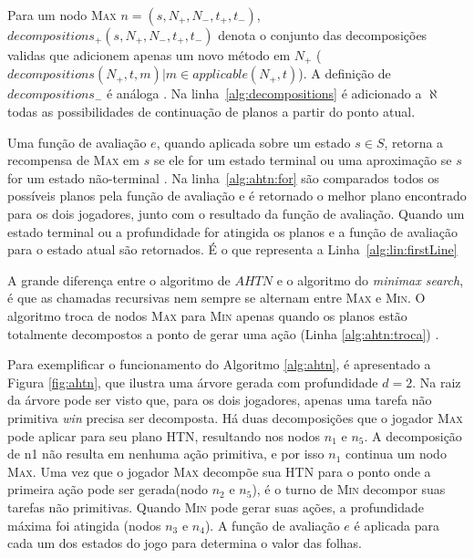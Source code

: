 Para um nodo \textsc{Max} $n = (s, N_{+}, N_{-}, t_{+}, t_{-})$, $decompositions_{+}(s, N_{+}, N_{-}, t_{+}, t_{-})$ denota o conjunto das decomposições validas que adicionem apenas um novo método em $N_{+}$ (${decompositions(N_{+}, t, m) | m \in applicable(N_{+}, t)}$).
A definição de $decompositions_{-}$ é análoga \cite{ontanon2015adversarial}.
Na linha~\ref{alg:decompositions} é adicionado a $\aleph$ todas as possibilidades de continuação de planos a partir do ponto atual.

Uma função de avaliação $e$, quando aplicada sobre um estado $s \in S$, retorna a recompensa de \textsc{Max} em $s$ se ele for um estado terminal ou uma aproximação se $s$ for um estado não-terminal \cite{ontanon2015adversarial}. 
Na linha~\ref{alg:ahtn:for} são comparados todos os possíveis planos pela função de avaliação e é retornado o melhor plano encontrado para os dois jogadores, junto com o resultado da função de avaliação. 
Quando um estado terminal ou a profundidade for atingida os planos e a função de avaliação para o estado atual são retornados. É o que representa a Linha~\ref{alg:lin:firstLine}

A grande diferença entre o algoritmo de $AHTN$ e o algoritmo do \textit{minimax search}, é que as chamadas recursivas nem sempre se alternam entre \textsc{Max} e \textsc{Min}. 
O algoritmo troca de nodos \textsc{Max} para \textsc{Min} apenas quando os planos estão totalmente decompostos a ponto de gerar uma ação (Linha \ref{alg:ahtn:troca}) \cite{ontanon2015adversarial}.

Para exemplificar o funcionamento do Algoritmo \ref{alg:ahtn}, é apresentado a Figura \ref{fig:ahtn}, que ilustra uma árvore gerada com profundidade $d = 2$. 
Na raiz da árvore pode ser visto que, para os dois jogadores, apenas uma tarefa não primitiva \textit{win} precisa ser decomposta. 
Há duas decomposições que o jogador \textsc{Max} pode aplicar para seu plano HTN, resultando nos nodos $n_{1}$ e $n_{5}$. 
A decomposição de n1 não resulta em nenhuma ação primitiva, e por isso $n_{1}$ continua um nodo \textsc{Max}. 
Uma vez que o jogador \textsc{Max} decompõe sua HTN para o ponto onde a primeira ação pode ser gerada(nodo $n_{2}$ e $n_{5}$), é o turno de \textsc{Min} decompor suas tarefas não primitivas. Quando \textsc{Min} pode gerar suas ações, a profundidade máxima foi atingida (nodos $n_{3}$ e $n_{4}$). 
A função de avaliação $e$ é aplicada para cada um dos estados do jogo para determina o valor das folhas.

